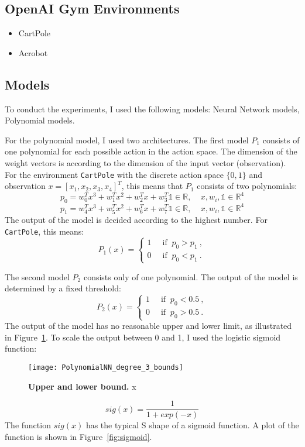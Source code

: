 \subsection{OpenAI Gym Environments}
\begin{itemize}
  \item CartPole
  \item Acrobot
\end{itemize}

\subsection{Models}
\label{ssec:models}
To conduct the experiments, I used the following models: Neural Network models, Polynomial models.

For the polynomial model, I used two architectures. The first model $P_1$ consists of one polynomial for each possible action in the action space. The dimension of the weight vectors is according to the dimension of the input vector (observation). For the environment \verb|CartPole| with the discrete action space $\{0, 1\}$ and observation $x = [x_1, x_2, x_3, x_4]^T$, this means that $P_1$ consists of two polynomials:
\[
  p_0 = w_0^T x^3 + w_1^T x^2 + w_2^T x + w_3^T \mathbb{1} \in \mathbb{R}, \ \ \ \ \ x, w_i, \mathbb{1} \in \mathbb{R}^4
\]
\[
  p_1 = w_4^T x^3 + w_5^T x^2 + w_6^T x + w_7^T \mathbb{1} \in \mathbb{R}, \ \ \ \ \ x, w_i, \mathbb{1} \in \mathbb{R}^4
\]
The output of the model is decided according to the highest number. For \verb|CartPole|, this means:
\[
  P_1(x) =
  \begin{cases}1~&{\text{ if }}~p_0>p_1~,\\0~&{\text{ if }}~p_0<p_1~.\end{cases}
\]

The second model $P_2$ consists only of one polynomial. The output of the model is determined by a fixed threshold:
\[
  P_2(x) =
  \begin{cases}1~&{\text{ if }}~p_0<0.5~,\\0~&{\text{ if }}~p_0>0.5~.\end{cases}
\]
The output of the model has no reasonable upper and lower limit, as illustrated in Figure~\ref{fig:bounds}. To scale the output between 0 and 1, I used the logistic sigmoid function:
\begin{figure}[ht]
\centering
\texttt{[image: PolynomialNN\_degree\_3\_bounds]}
\caption[Upper and lower bound]{
  \textbf{Upper and lower bound.}
  x
}
\label{fig:bounds}
\end{figure}
\[
  sig(x) = \frac{1}{1 + exp(-x)}
\]
The function $sig(x)$ has the typical S shape of a sigmoid function. A plot of the function is shown in Figure~\ref{fig:sigmoid}.

